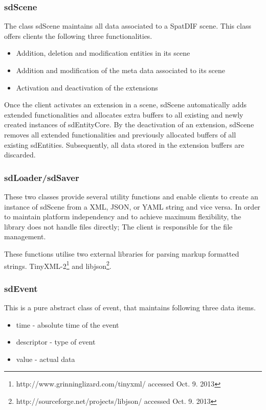 \documentclass[a4paper]{article}
\begin{document}
\subsubsection{sdScene}
The class sdScene maintains all data associated to a SpatDIF scene. This class offers clients the following three functionalities.

\begin{itemize}
\item Addition, deletion and modification entities in its scene
\item Addition and modification of the meta data associated to its scene
\item Activation and deactivation of the extensions
\end{itemize}

Once the client activates an extension in a scene, sdScene automatically adds extended functionalities and allocates extra buffers to all existing and newly created instances of sdEntityCore. By the deactivation of an extension, sdScene removes all extended functionalities and previously allocated buffers of all existing sdEntities. Subsequently, all data stored in the extension buffers are discarded.

\subsubsection{sdLoader/sdSaver}
These two classes provide several utility functions and enable clients to create an instance of sdScene from a XML, JSON, or YAML string and vice versa. In order to maintain platform independency and to achieve maximum flexibility, the library does not handle files directly; The client is responsible for the file management. 

These functions utilise two external libraries for parsing markup formatted strings. TinyXML-2\footnote{http://www.grinninglizard.com/tinyxml/ accessed Oct. 9. 2013} and libjson\footnote{http://sourceforge.net/projects/libjson/ accessed Oct. 9. 2013}.

\subsubsection{sdEvent}
This is a pure abstract class of event, that maintains following three data items.

\begin{itemize}
\item time - absolute time of the event
\item descriptor - type of event
\item value - actual data
\end{itemize}
\end{document}
